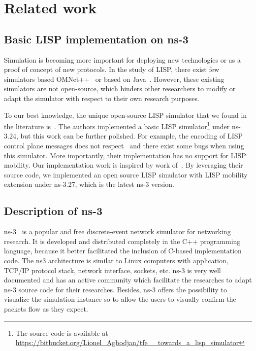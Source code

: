 \section{Related work}
\label{sec:ns3_related_work}
\subsection{Basic LISP implementation on ns-3}
\label{sec:ns3_basic_lisp}
Simulation is becoming more important for deploying new technologies or as a proof of concept of new protocols. In the study of LISP, there exist few simulators based OMNet++~\cite{vesely2015locator, vesely2014multicast, klein2012integration} or based on Java~\cite{stockmayer2016jlisp}. However, these existing simulators are not open-source, which hinders other researchers to modify or adapt the simulator with respect to their own research purposes.

To our best knowledge, the unique open-source LISP simulator that we found in the literature is~\cite{lionel2016}. The authors implemented a basic LISP simulator\footnote{The source code is available at \url{https://bitbucket.org/Lionel_Agbodjan/tfe__towards_a_lisp_simulator}} under ns-3.24, but this work can be further polished. For example, the encoding of LISP control plane messages does not respect~\cite{rfc6830} and there exist some bugs when using this simulator. More importantly, their implementation has no support for LISP mobility. Our implementation work is inspired by work of~\cite{lionel2016}. By leveraging their source code, we implemented an open source LISP simulator with LISP mobility extension under ns-3.27, which is the latest ns-3 version. 

\subsection{Description of ns-3}
\label{sec:ns3_ns3}
ns-3~\cite{ns3} is a popular and free discrete-event network simulator for networking research. It is developed and distributed completely in the C++ programming language, because it better facilitated the inclusion of C-based implementation code. The ns3 architecture is similar to Linux computers with application, TCP/IP protocol stack, network interface, sockets, etc. ns-3 is very well documented and has an active community which facilitate the researches to adapt ns-3 source code for their researches.  Besides, ns-3 offers the possibility to visualize the simulation instance so to allow the users to visually confirm the packets flow as they expect. 

